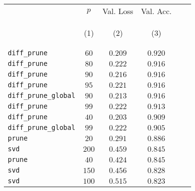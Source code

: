 \begin{table}[tbh]
        \caption{}
        \label{tab:}
        \centering
        \vspace{1em}
        \begin{tabular}{lccccc}
\toprule
{} &                         $p$ &                   Val. Loss &                   Val. Acc. \\
{} & \hypertarget{tabcol:1}{(1)} & \hypertarget{tabcol:2}{(2)} & \hypertarget{tabcol:3}{(3)} \\
\midrule
\texttt{diff\_prune}         &      $60$\textsuperscript{} &   $0.209$\textsuperscript{} &   $0.920$\textsuperscript{} \\
\texttt{diff\_prune}         &      $80$\textsuperscript{} &   $0.222$\textsuperscript{} &   $0.916$\textsuperscript{} \\
\texttt{diff\_prune}         &      $90$\textsuperscript{} &   $0.216$\textsuperscript{} &   $0.916$\textsuperscript{} \\
\texttt{diff\_prune}         &      $95$\textsuperscript{} &   $0.221$\textsuperscript{} &   $0.916$\textsuperscript{} \\
\texttt{diff\_prune\_global} &      $90$\textsuperscript{} &   $0.213$\textsuperscript{} &   $0.916$\textsuperscript{} \\
\texttt{diff\_prune}         &      $99$\textsuperscript{} &   $0.222$\textsuperscript{} &   $0.913$\textsuperscript{} \\
\texttt{diff\_prune}         &      $40$\textsuperscript{} &   $0.203$\textsuperscript{} &   $0.909$\textsuperscript{} \\
\texttt{diff\_prune\_global} &      $99$\textsuperscript{} &   $0.222$\textsuperscript{} &   $0.905$\textsuperscript{} \\
\texttt{prune}               &      $20$\textsuperscript{} &   $0.291$\textsuperscript{} &   $0.886$\textsuperscript{} \\
\texttt{svd}                 &     $200$\textsuperscript{} &   $0.459$\textsuperscript{} &   $0.845$\textsuperscript{} \\
\texttt{prune}               &      $40$\textsuperscript{} &   $0.424$\textsuperscript{} &   $0.845$\textsuperscript{} \\
\texttt{svd}                 &     $150$\textsuperscript{} &   $0.456$\textsuperscript{} &   $0.828$\textsuperscript{} \\
\texttt{svd}                 &     $100$\textsuperscript{} &   $0.515$\textsuperscript{} &   $0.823$\textsuperscript{} \\

\end{tabular}
\end{table}
